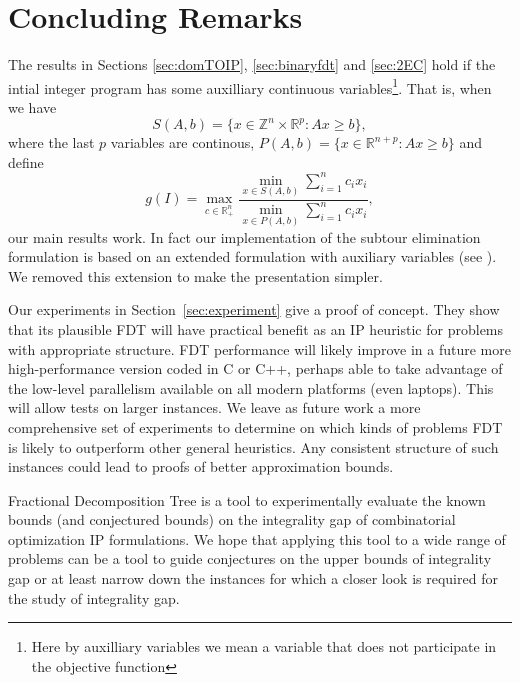 \section{Concluding Remarks}

The results in Sections \ref{sec:domTOIP}, \ref{sec:binaryfdt}  and \ref{sec:2EC} hold if the intial integer program has some auxilliary continuous variables\footnote{Here by auxilliary variables we mean a variable that does not participate in the objective function}. That is, when we have 
\begin{equation*}
S(A,b) = \{x\in \mathbb{Z}^n\times \mathbb{R}^p: Ax\geq b\},
\end{equation*}
where the last $p$ variables are continous, $P(A,b) = \{x\in \mathbb{R}^{n+p}: Ax\geq b\}$
and define
\begin{equation*}
g(I) = \max_{c\in \mathbb{R}^n_+}\frac{\min_{x\in S(A,b)} \sum_{i=1}^{n}c_ix_i}{\min_{x\in P(A,b)} \sum_{i=1}^{n}c_ix_i},
\end{equation*}
our main results work. In fact our implementation of the subtour elimination formulation is based on an extended formulation with auxiliary variables (see \cite{subtour-extended}). We removed this extension to make the presentation simpler.

Our experiments in Section~\ref{sec:experiment} give a proof of concept. They show that its plausible FDT will have practical benefit as an IP heuristic for problems with appropriate structure. FDT performance will likely improve in a future more high-performance version coded in C or C++, perhaps able to take advantage of the low-level parallelism available on all modern platforms (even laptops).  This will allow tests on larger instances. We leave as future work a more comprehensive set of experiments to determine on which kinds of problems FDT is likely to outperform other general heuristics. Any consistent structure of such instances could lead to proofs of better approximation bounds.

Fractional Decomposition Tree is a tool to experimentally evaluate the known bounds (and conjectured bounds) on the integrality gap of combinatorial optimization IP formulations. We hope that applying this tool to a wide range of problems can be a tool to guide conjectures on the upper bounds of integrality gap or at least narrow down the instances for which a closer look is required for the study of integrality gap.


